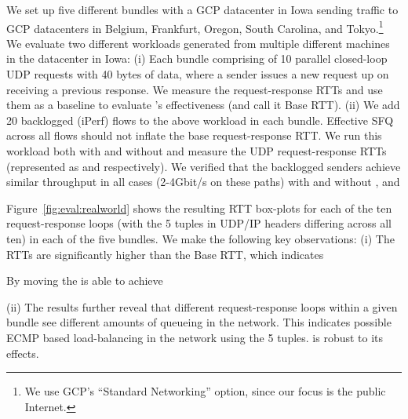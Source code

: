 We set up five different bundles with a GCP datacenter in Iowa sending traffic to GCP datacenters in Belgium, Frankfurt, Oregon, South Carolina, and Tokyo.\footnote{We use GCP's ``Standard Networking'' option, since our focus is the public Internet.}
We evaluate two different workloads generated from multiple different machines in the datacenter in Iowa: (i) Each bundle comprising of 10 parallel closed-loop UDP requests with 40 bytes of data, where a sender issues a new request up on receiving a previous response. We measure the request-response RTTs and use them as a baseline to evaluate \name's effectiveness (and call it Base RTT). (ii) We add 20 backlogged (iPerf) flows to the above workload in each bundle. Effective SFQ across all flows should not inflate the base request-response RTT. We run this workload both with and without \name and measure the UDP request-response RTTs (represented as \name and \baseline respectively).
We verified that the backlogged senders achieve similar throughput in all cases (2-4Gbit/s on these paths) with and without \name, and 

Figure~\ref{fig:eval:realworld} shows the resulting RTT box-plots for each of the ten request-response loops (with the 5 tuples in UDP/IP headers differing across all ten) in each of the five bundles. %
We make the following key observations: (i) The \baseline RTTs are significantly higher than the Base RTT, which indicates 

By moving the \name is able to achieve 

(ii) The \baseline results further reveal that different request-response loops within a given bundle see different amounts of queueing in the network. This indicates possible ECMP based load-balancing in the network using the 5 tuples. \name is robust to its effects.

